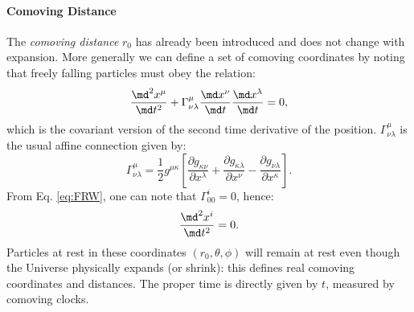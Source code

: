 \paragraph{Comoving Distance} %
\label{par:comoving_distance}
The \emph{comoving distance} $r_0$ has already been introduced and does not change with expansion. More generally we can define a set of comoving coordinates by noting that freely falling particles must obey the relation:
\begin{equation}
	\frac{\md^2 x^\mu}{\md t^2}+\Gamma^\mu_{\nu\lambda}\frac{\md x^\nu}{\md t}\frac{\md x^\lambda}{\md t}=0,
\end{equation}
which is the covariant version of the second time derivative of the position. $\Gamma^\mu_{\nu\lambda}$ is the usual affine connection given by:
\begin{equation}
	\Gamma^\mu_{\nu\lambda}=\frac{1}{2}g^{\mu\kappa}\left[\frac{\partial g_{\kappa\nu}}{\partial x^\lambda}+\frac{\partial g_{\kappa\lambda}}{\partial x^\nu}-\frac{\partial g_{\nu\lambda}}{\partial x^\kappa}\right].
\end{equation}
From Eq. \ref{eq:FRW}, one can note that $\Gamma^i_{00}=0$, hence:
\begin{equation}
	\frac{\md^2 x^i}{\md t^2}=0.
\end{equation}
Particles at rest in these coordinates $(r_0,\theta,\phi)$ will remain at rest even though the Universe physically expands (or shrink): this defines real comoving coordinates and distances. The proper time is directly given by $t$, measured by comoving clocks.

